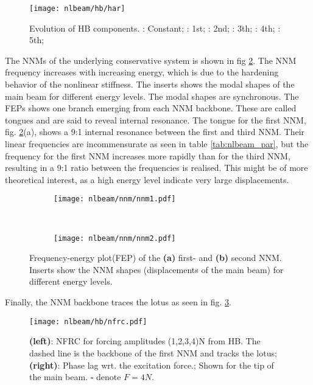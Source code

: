 \begin{figure}[!ht]
  \centering
  \texttt{[image: nlbeam/hb/har]}
  \caption{Evolution of HB components.
    \textcolor{blue}{\sampleline{}}: Constant;
    \sampleline{}: 1st;
    \textcolor{orange}{}: 2nd;
    \textcolor{green}{}: 3th;
    \textcolor{red}{\sampleline{}}: 4th;
    \textcolor{purple}{}: 5th;
  }
  \label{fig:nlbeam_hb_components}
\end{figure}

The NNMs of the underlying conservative system is shown in fig
\ref{fig:nlbeam_nnm}. The NNM frequency increases with increasing energy, which
is due to the hardening behavior of the nonlinear stiffness. The inserts shows
the modal shapes of the main beam for different energy levels. The modal shapes
are synchronous.
The FEPs shows one branch emerging from each NNM backbone. These are called
tongues and are said to reveal internal resonance. The tongue for the first NNM,
fig. \ref{fig:nlbeam_nnm}(a), shows a 9:1 internal resonance between the first
and third NNM. Their linear frequencies are incommensurate as seen in table
\ref{tab:nlbeam_par}, but the frequency for the first NNM increases more rapidly
than for the third NNM, resulting in a 9:1 ratio between the frequencies is
realised. This might be of more theoretical interest, as a high energy level
indicate very large displacements.

\begin{figure}[!ht]
  \centering
 \begin{subfigure}[b]{0.45\textwidth}
    \texttt{[image: nlbeam/nnm/nnm1.pdf]}
    \caption{}
  \end{subfigure}
  ~
  \begin{subfigure}[b]{0.45\textwidth}
    \texttt{[image: nlbeam/nnm/nnm2.pdf]}
    \caption{}
  \end{subfigure}
  \caption{Frequency-energy plot(FEP) of the
    \textbf{(a)} first- and
    \textbf{(b)} second NNM. Inserts show the NNM shapes (displacements of the
    main beam) for different energy levels.}
  \label{fig:nlbeam_nnm}
\end{figure}

Finally, the NNM backbone traces the lotus as seen in fig.
\ref{fig:nlbeam_sweep}.

\begin{figure}[!ht]
  \centering
  \texttt{[image: nlbeam/hb/nfrc.pdf]}
  \caption{
    \textbf{(left)}:
    NFRC for forcing amplitudes (1,2,3,4)N from HB. The dashed line is
    the backbone of the first NNM and tracks the lotus;
    \textbf{(right)}:
    Phase lag wrt. the excitation force.;
    Shown for the tip of the main beam. $\square$
    denote $F=4N$.
    }
  \label{fig:nlbeam_sweep}
\end{figure}


